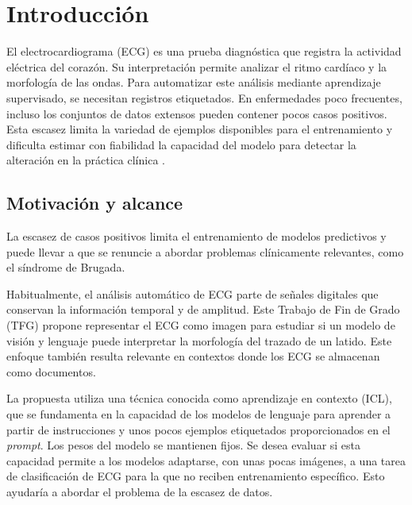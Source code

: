 \chapter{Introducción}
\label{chap:introduccion}

\begingroup
{}

El electrocardiograma (ECG) es una prueba diagnóstica que registra la actividad eléctrica del corazón. Su interpretación permite analizar el ritmo cardíaco y la morfología de las ondas. Para automatizar este análisis mediante aprendizaje supervisado, se necesitan registros etiquetados. En enfermedades poco frecuentes, incluso los conjuntos de datos extensos pueden contener pocos casos positivos. Esta escasez limita la variedad de ejemplos disponibles para el entrenamiento y dificulta estimar con fiabilidad la capacidad del modelo para detectar la alteración en la práctica clínica \cite{ribeiro2020,sangha2022,saleh2026brugada}.

\section{Motivación y alcance}

La escasez de casos positivos limita el entrenamiento de modelos predictivos y puede llevar a que se renuncie a abordar problemas clínicamente relevantes, como el síndrome de Brugada.

Habitualmente, el análisis automático de ECG parte de señales digitales que conservan la información temporal y de amplitud. Este Trabajo de Fin de Grado (TFG) propone representar el ECG como imagen para estudiar si un modelo de visión y lenguaje puede interpretar la morfología del trazado de un latido. Este enfoque también resulta relevante en contextos donde los ECG se almacenan como documentos.

La propuesta utiliza una técnica conocida como aprendizaje en contexto (ICL), que se fundamenta en la capacidad de los modelos de lenguaje para aprender a partir de instrucciones y unos pocos ejemplos etiquetados proporcionados en el \textit{prompt}. Los pesos del modelo se mantienen fijos. Se desea evaluar si esta capacidad permite a los modelos adaptarse, con unas pocas imágenes, a una tarea de clasificación de ECG para la que no reciben entrenamiento específico. Esto ayudaría a abordar el problema de la escasez de datos.

